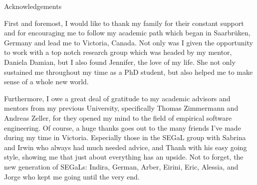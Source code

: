 \newpage
{}

\begin{center}
Acknowledgements
\end{center}

First and foremost, I would like to thank my family for their constant support and for encouraging me to follow my academic path which began in Saarbr{\"u}ken, Germany and lead me to Victoria, Canada.
%
Not only was I given the opportunity to work with a top notch research group which was headed by my mentor, Daniela Damian, but I also found Jennifer, the love of my life. She not only sustained me throughout my time as a PhD student, but also helped me to make sense of a whole new world.

Furthermore, I owe a great deal of gratitude to my academic advisors and mentors from my previous University, specifically Thomas Zimmermann and Andreas Zeller, for they opened my mind to the field of empirical software engineering.
%
Of course, a huge thanks goes out to the many friends I've made during my time in Victoria. Especially those in the SEGaL group with Sabrina and Irwin who always had much needed advice, and Thanh with his easy going style, showing me that just about everything has an upside.
Not to forget, the new generation of SEGaLs: Indira, German, Arber, Eirini, Eric, Alessia, and Jorge who kept me going until the very end.




